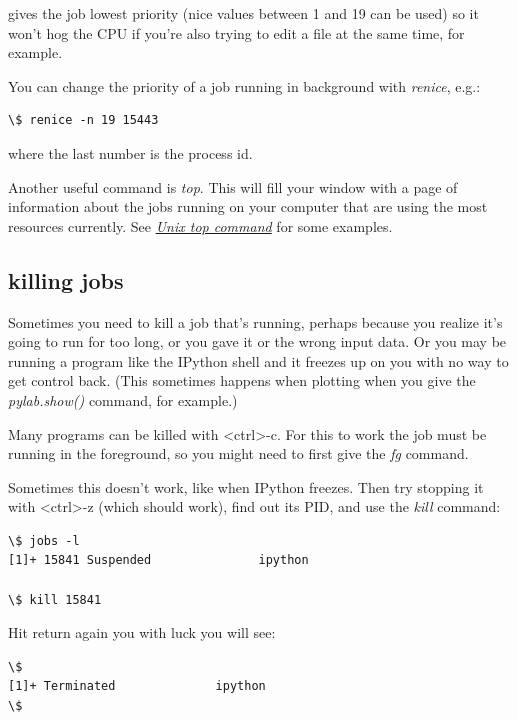 \documentclass[letterpaper,10pt,english]{sphinxmanual}
\begin{document}
gives the job lowest priority (nice values between 1 and 19 can be used) so
it won't hog the CPU if you're also trying to edit a file at the same time,
for example.

You can change the priority of a job running in background with \emph{renice},
e.g.:

\begin{Verbatim}[commandchars=\\\{\}]
\$ renice -n 19 15443
\end{Verbatim}

where the last number is the process id.

Another useful command is \emph{top}.  This will fill your window with a page of
information about the jobs running on your computer that are using the most
resources currently.  See {\hyperref[top:topcommand]{\emph{Unix top command}}} for some examples.


\subsection{killing jobs}
\label{unix:killing-jobs}\label{unix:kill}
Sometimes you need to kill a job that's running, perhaps because you realize
it's going to run for too long, or you gave it or the wrong input data.  Or
you may be running a program like the IPython shell and it freezes up on you
with no way to get control back.  (This sometimes happens when plotting when
you give the \emph{pylab.show()} command, for example.)

Many programs can be killed with \textless{}ctrl\textgreater{}-c.  For this to work the job must be
running in the foreground, so you might need to first give the \emph{fg} command.

Sometimes this doesn't work, like when IPython freezes.  Then try stopping
it with \textless{}ctrl\textgreater{}-z (which should work), find out its PID, and use the \emph{kill}
command:

\begin{Verbatim}[commandchars=\\\{\}]
\$ jobs -l
[1]+ 15841 Suspended               ipython

\$ kill 15841
\end{Verbatim}

Hit return again you with luck you will see:

\begin{Verbatim}[commandchars=\\\{\}]
\$
[1]+ Terminated              ipython
\$
\end{Verbatim}
\end{document}
